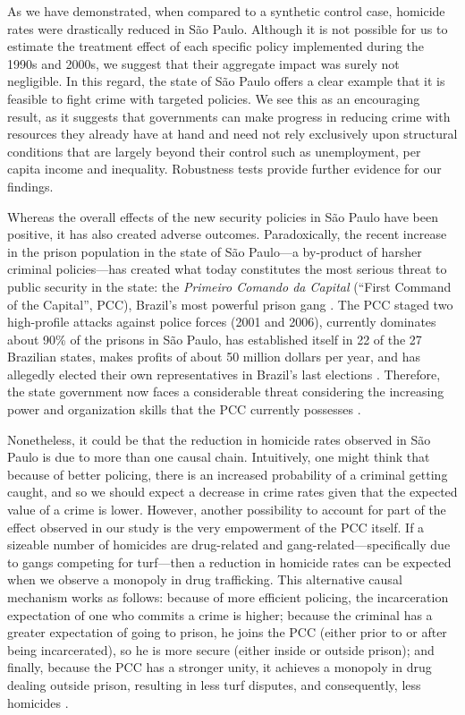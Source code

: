 \documentclass[a4paper,11pt]{article}
\begin{document}
As we have demonstrated, when compared to a synthetic control case, homicide rates were drastically reduced in S\~{a}o Paulo. Although it is not possible for us to estimate the treatment effect of each specific policy implemented during the 1990s and 2000s, we suggest that their aggregate impact was surely not negligible. In this regard, the state of S\~{a}o Paulo offers a clear example that it is feasible to fight crime with targeted policies. We see this as an encouraging result, as it suggests that governments can make progress in reducing crime with resources they already have at hand and need not rely exclusively upon structural conditions that are largely beyond their control such as unemployment, per capita income and inequality. Robustness tests provide further evidence for our findings.

Whereas the overall effects of the new security policies in S\~{a}o Paulo have been positive, it has also created adverse outcomes. Paradoxically, the recent increase in the prison population in the state of S\~{a}o Paulo---a by-product of harsher criminal policies---has created what today constitutes the most serious threat to public security in the state: the \textit{Primeiro Comando da Capital} (``First Command of the Capital'', PCC), Brazil's most powerful prison gang \citep{dias2009, souza2007}. The PCC staged two high-profile attacks against police forces (2001 and 2006), currently dominates about 90\% of the prisons in S\~{a}o Paulo, has established itself in 22 of the 27 Brazilian states, makes profits of about 50 million dollars per year, and has allegedly elected their own representatives in Brazil's last elections \citep{biondi2010}. Therefore, the state government now faces a considerable threat considering the increasing power and organization skills that the PCC currently possesses \citep{freire2014}.

Nonetheless, it could be that the reduction in homicide rates observed in S\~{a}o Paulo is due to more than one causal chain. Intuitively, one might think that because of better policing, there is an increased probability of a criminal getting caught, and so we should expect a decrease in crime rates given that the expected value of a crime is lower. However, another possibility to account for part of the effect observed in our study is the very empowerment of the PCC itself. If a sizeable number of homicides are drug-related and gang-related---specifically due to gangs competing for turf---then a reduction in homicide rates can be expected when we observe a monopoly in drug trafficking. This alternative causal mechanism works as follows: because of more efficient policing, the incarceration expectation of one who commits a crime is higher; because the criminal has a greater expectation of going to prison, he joins the PCC (either prior to or after being incarcerated), so he is more secure (either inside or outside prison); and finally, because the PCC has a stronger unity, it achieves a monopoly in drug dealing outside prison, resulting in less turf disputes, and consequently, less homicides \citep{skarbek2011}.
\end{document}
